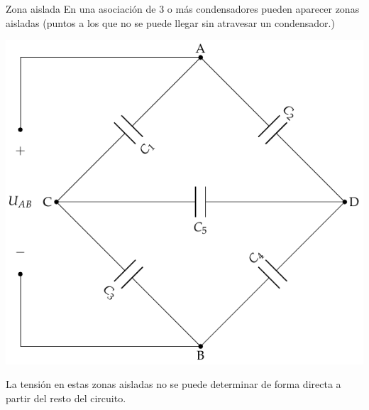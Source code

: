 \documentclass[aspectratio=169, usenames,svgnames,dvipsnames]{beamer}
\begin{document}
\begin{frame}[label={sec:org9adf2c7}]{Zona aislada}
En una asociación de 3 o más condensadores pueden aparecer zonas aisladas (puntos a los que no se puede llegar sin atravesar un condensador.)

\begin{center}
\includegraphics[height=0.6\textheight]{../figs/CondensadoresZonaAislada.pdf}
\end{center}

La tensión en estas zonas aisladas no se puede determinar de forma directa a partir del resto del circuito.
\end{frame}
\end{document}
